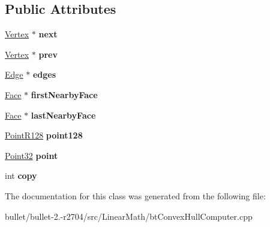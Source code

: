 \subsection*{Public Attributes}
\begin{DoxyCompactItemize}
\item 
\hypertarget{classbt_convex_hull_internal_1_1_vertex_a3f64cdb114285bb9d6be175640433d1f}{\hyperlink{classbt_convex_hull_internal_1_1_vertex}{Vertex} $\ast$ {\bfseries next}}\label{classbt_convex_hull_internal_1_1_vertex_a3f64cdb114285bb9d6be175640433d1f}

\item 
\hypertarget{classbt_convex_hull_internal_1_1_vertex_ac32658704326ef070e0df3d9f378f565}{\hyperlink{classbt_convex_hull_internal_1_1_vertex}{Vertex} $\ast$ {\bfseries prev}}\label{classbt_convex_hull_internal_1_1_vertex_ac32658704326ef070e0df3d9f378f565}

\item 
\hypertarget{classbt_convex_hull_internal_1_1_vertex_a2106108aa65a7e511a171e1c5d2ba0bb}{\hyperlink{classbt_convex_hull_internal_1_1_edge}{Edge} $\ast$ {\bfseries edges}}\label{classbt_convex_hull_internal_1_1_vertex_a2106108aa65a7e511a171e1c5d2ba0bb}

\item 
\hypertarget{classbt_convex_hull_internal_1_1_vertex_a06c81d848b7e5f6c704cb4f9e806ed0f}{\hyperlink{classbt_convex_hull_internal_1_1_face}{Face} $\ast$ {\bfseries first\+Nearby\+Face}}\label{classbt_convex_hull_internal_1_1_vertex_a06c81d848b7e5f6c704cb4f9e806ed0f}

\item 
\hypertarget{classbt_convex_hull_internal_1_1_vertex_a67de245eefb3a7ba7e0d5dda378b50cd}{\hyperlink{classbt_convex_hull_internal_1_1_face}{Face} $\ast$ {\bfseries last\+Nearby\+Face}}\label{classbt_convex_hull_internal_1_1_vertex_a67de245eefb3a7ba7e0d5dda378b50cd}

\item 
\hypertarget{classbt_convex_hull_internal_1_1_vertex_ae949e82a65f9ccb4dc9da1c2c0537d3c}{\hyperlink{classbt_convex_hull_internal_1_1_point_r128}{Point\+R128} {\bfseries point128}}\label{classbt_convex_hull_internal_1_1_vertex_ae949e82a65f9ccb4dc9da1c2c0537d3c}

\item 
\hypertarget{classbt_convex_hull_internal_1_1_vertex_a0c77d52a6bed1f70d7e1a8ec1e314072}{\hyperlink{classbt_convex_hull_internal_1_1_point32}{Point32} {\bfseries point}}\label{classbt_convex_hull_internal_1_1_vertex_a0c77d52a6bed1f70d7e1a8ec1e314072}

\item 
\hypertarget{classbt_convex_hull_internal_1_1_vertex_aec0c6585ff967f4603e332568ec5d7f5}{int {\bfseries copy}}\label{classbt_convex_hull_internal_1_1_vertex_aec0c6585ff967f4603e332568ec5d7f5}

\end{DoxyCompactItemize}


The documentation for this class was generated from the following file\+:\begin{DoxyCompactItemize}
\item 
bullet/bullet-\/2.-\/r2704/src/\+Linear\+Math/bt\+Convex\+Hull\+Computer.\+cpp\end{DoxyCompactItemize}
